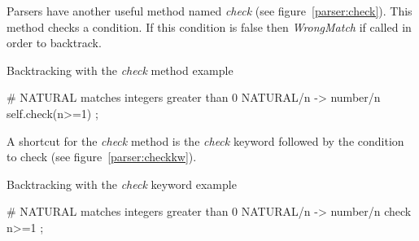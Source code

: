 Parsers have another useful method named \emph{check} (see figure~\ref{parser:check}).
This method checks a condition.
If this condition is false then \emph{WrongMatch} if called in order to backtrack.

\begin{code}
\caption{Backtracking with the \emph{check} method example} \label{parser:check}
\begin{verbatimtab}[4]
	# NATURAL matches integers greater than 0
	NATURAL/n ->
		number/n
		{{ self.check(n>=1) }}
		;
\end{verbatimtab}
\end{code}

A shortcut for the \emph{check} method is the \emph{check} keyword followed by the condition to check (see figure~\ref{parser:checkkw}).

\begin{code}
\caption{Backtracking with the \emph{check} keyword example} \label{parser:checkkw}
\begin{verbatimtab}[4]
	# NATURAL matches integers greater than 0
	NATURAL/n ->
		number/n
		check {{ n>=1 }}
		;
\end{verbatimtab}
\end{code}

